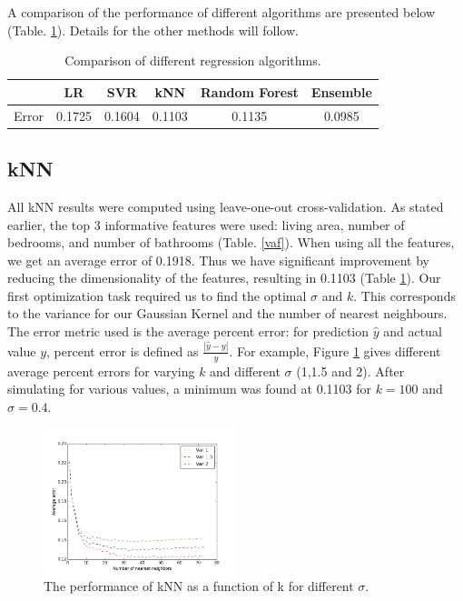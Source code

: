 \documentclass[conference]{IEEEtran}
\begin{document}
A comparison of the performance of different algorithms are presented below (Table. \ref{compar}). Details for the other methods will follow.

\begin{table}[htbp]
\footnotesize
\centering
\caption{\footnotesize Comparison of different regression algorithms.}
\begin{tabular}{|c|c|c|c|c|c|}
\hline
 & LR & SVR & kNN & Random Forest & Ensemble\\ \hline
Error & 0.1725 & 0.1604 & 0.1103 & 0.1135 & 0.0985\\
\hline
\end{tabular}
\label{compar}
\end{table}
\normalsize

\subsection{kNN}

All kNN results were computed using leave-one-out cross-validation. As stated earlier, the top 3 informative features were used: living area, number of bedrooms, and number of bathrooms (Table. \ref{vaf}). When using all the features, we get an average error of 0.1918. Thus we have significant improvement by reducing the dimensionality of the features, resulting in 0.1103 (Table \ref{compar}). Our first optimization task required us to find the optimal $\sigma$ and $k$. This corresponds to the variance for our Gaussian Kernel and the number of nearest neighbours. The error metric used is the average percent error: for prediction $\hat{y}$ and actual value $y$, percent error is defined as $\frac{|\hat{y}-y|}{y}$. For example, Figure \ref{knnOpti} gives different average percent errors for varying $k$ and different $\sigma$ (1,1.5 and 2). After simulating for various values, a minimum was found at 0.1103 for $k=100$ and $\sigma=0.4$.

\begin{figure}[H]
\centering
\includegraphics[width=0.5\textwidth]{error_vs_k_differentVAR.png}
\caption{\scriptsize The performance of kNN as a function of k for different $\sigma$.}
\label{knnOpti}
\end{figure}
\end{document}

